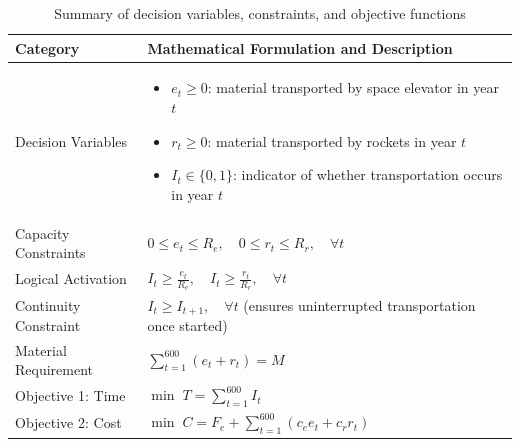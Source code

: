 \documentclass[12pt]{mcmthesis}
\begin{document}
\begin{table}[htbp]
    \small
    \centering
    \caption{Summary of decision variables, constraints, and objective functions}
    \label{tab:model_elements}
    \begin{tabular}{p{} p{}}
        \toprule
        \textbf{Category}  & \textbf{Mathematical Formulation and Description} \\
        \midrule

        Decision Variables &
        \begin{itemize}
            \setlength\itemsep{1pt}
            \item $e_t \ge 0$: material transported by space elevator in year $t$
            \item $r_t \ge 0$: material transported by rockets in year $t$
            \item $I_t \in \{0,1\}$: indicator of whether transportation occurs in year $t$
        \end{itemize}
        \\

        \midrule
        Capacity Constraints
                           &
        $
            0 \le e_t \le R_e, \quad
            0 \le r_t \le R_r, \quad \forall t
        $
        \\

        \midrule
        Logical Activation
                           &
        $
            I_t \ge \frac{e_t}{R_e}, \quad
            I_t \ge \frac{r_t}{R_r}, \quad \forall t
        $
        \\

        \midrule
        Continuity Constraint
                           &
        $
            I_t \ge I_{t+1}, \quad \forall t
        $
        (ensures uninterrupted transportation once started)
        \\

        \midrule
        Material Requirement
                           &
        $
            \sum_{t=1}^{600} (e_t + r_t) = M
        $
        \\

        \midrule
        Objective 1: Time
                           &
        $
            \min \; T = \sum_{t=1}^{600} I_t
        $
        \\

        \midrule
        Objective 2: Cost
                           &
        $
            \min \; C = F_e + \sum_{t=1}^{600} (c_e e_t + c_r r_t)
        $
        \\

        \bottomrule
    \end{tabular}
\end{table}
\end{document}
